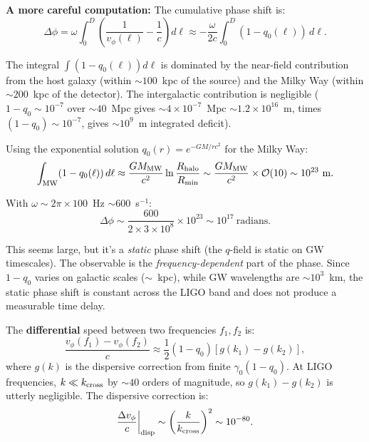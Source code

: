 \documentclass[reprint]{revtex4-2}
\begin{document}
\textbf{A more careful computation:} The cumulative phase shift is:
\begin{equation}
\Delta\phi = \omega\int_0^D \left(\frac{1}{v_\phi(\ell)} - \frac{1}{c}\right)d\ell \approx -\frac{\omega}{2c}\int_0^D (1-q_0(\ell))\,d\ell.
\end{equation}

The integral $\int (1-q_0(\ell))d\ell$ is dominated by the near-field contribution from the host galaxy (within $\sim 100$~kpc of the source) and the Milky Way (within $\sim 200$~kpc of the detector). The intergalactic contribution is negligible ($1-q_0 \sim 10^{-7}$ over $\sim 40$~Mpc gives $\sim 4\times 10^{-7}$~Mpc $\sim 1.2\times 10^{16}$~m, times $(1-q_0) \sim 10^{-7}$, gives $\sim 10^9$~m integrated deficit).

Using the exponential solution $q_0(r)=e^{-GM/rc^2}$ for the Milky Way:
\begin{equation}
\int_{\rm MW} (1-q_0(\ell))\,d\ell \approx \frac{GM_{\rm MW}}{c^2}\ln\frac{R_{\rm halo}}{R_{\rm min}} \sim \frac{GM_{\rm MW}}{c^2}\times \mathcal{O}(10) \sim 10^{23}~\text{m}.
\end{equation}

With $\omega \sim 2\pi\times 100$~Hz $\sim 600$~s$^{-1}$:
\begin{equation}
\Delta\phi \sim \frac{600}{2\times 3\times 10^8}\times 10^{23} \sim 10^{17}~\text{radians}.
\end{equation}

This seems large, but it's a \emph{static} phase shift (the $q$-field is static on GW timescales). The observable is the \emph{frequency-dependent} part of the phase. Since $1-q_0$ varies on galactic scales ($\sim$~kpc), while GW wavelengths are $\sim 10^3$~km, the static phase shift is constant across the LIGO band and does not produce a measurable time delay.

The \textbf{differential} speed between two frequencies $f_1, f_2$ is:
\begin{equation}
\frac{v_\phi(f_1) - v_\phi(f_2)}{c} \approx \frac{1}{2}(1-q_0)\left[g(k_1) - g(k_2)\right],
\end{equation}
where $g(k)$ is the dispersive correction from finite $\gamma_0(1-q_0)$. At LIGO frequencies, $k \ll k_{\rm cross}$ by $\sim 40$ orders of magnitude, so $g(k_1)-g(k_2)$ is utterly negligible. The dispersive correction is:
\begin{equation}
\frac{\Delta v_\phi}{c}\bigg|_{\rm disp} \sim \left(\frac{k}{k_{\rm cross}}\right)^2 \sim 10^{-80}.
\end{equation}
\end{document}
